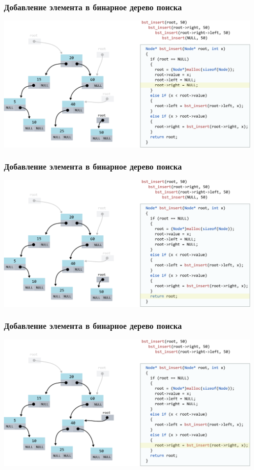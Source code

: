 \documentclass[10pt,pdf,hyperref={unicode}]{beamer}
\begin{document}
\begin{frame}[fragile]
\frametitle{Добавление элемента в бинарное дерево поиска}
\begin{center}
\includegraphics[width=\imageSizeMult\linewidth]{../images/codetree/codetree15.png}
\end{center}
\end{frame}

\begin{frame}[fragile]
\frametitle{Добавление элемента в бинарное дерево поиска}
\begin{center}
\includegraphics[width=\imageSizeMult\linewidth]{../images/codetree/codetree16.png}
\end{center}
\end{frame}

\begin{frame}[fragile]
\frametitle{Добавление элемента в бинарное дерево поиска}
\begin{center}
\includegraphics[width=\imageSizeMult\linewidth]{../images/codetree/codetree17.png}
\end{center}
\end{frame}
\end{document}
